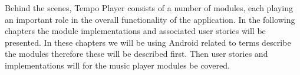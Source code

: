 Behind the scenes, Tempo Player consists of a number of modules, each playing an important role in the overall functionality of the application. In the following chapters the module implementations and associated user stories will be presented. In these chapters we will be using Android related to terms describe the modules therefore these will be described first. Then user stories and implementations will for the music player modules be covered.